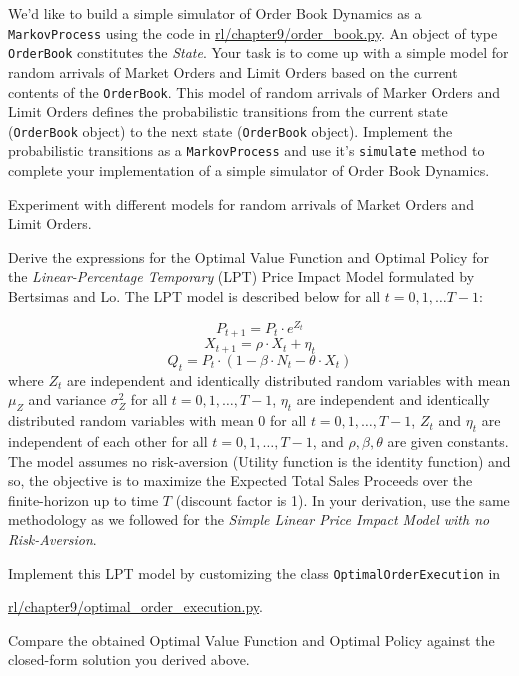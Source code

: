 \documentclass[12pt]{exam}
\begin{document}
\begin{questions}
\question We'd like to build a simple simulator of Order Book Dynamics as a \lstinline{MarkovProcess} using the code in \href{https://github.com/TikhonJelvis/RL-book/blob/master/rl/chapter9/order_book.py}{rl\//chapter9\//order\_book.py}. An object of type \lstinline{OrderBook} constitutes the {\em State}. Your task is to come up with a simple model for random arrivals of Market Orders and Limit Orders based on the current contents of the \lstinline{OrderBook}. This model of random arrivals of Marker Orders and Limit Orders defines the probabilistic transitions from the current state (\lstinline{OrderBook} object) to the next state (\lstinline{OrderBook} object). Implement the probabilistic transitions as a \lstinline{MarkovProcess} and use it's \lstinline{simulate} method to complete your implementation of a simple simulator of Order Book Dynamics.

Experiment with different models for random arrivals of Market Orders and Limit Orders.

\question Derive the expressions for the Optimal Value Function and Optimal Policy for the {\em Linear-Percentage Temporary} (LPT) Price Impact Model formulated by Bertsimas and Lo. The LPT model is described below for all $t = 0, 1, \ldots T-1$:

$$P_{t+1} = P_t \cdot e^{Z_t}$$
$$X_{t+1} = \rho \cdot X_t + \eta_t$$
$$Q_t = P_t \cdot (1 - \beta \cdot N_t - \theta \cdot X_t)$$
where $Z_t$ are independent and identically distributed random variables with mean $\mu_Z$ and variance $\sigma^2_Z$ for all $t = 0, 1, \ldots, T-1$, $\eta_t$ are independent and identically distributed random variables with mean 0 for all $t = 0, 1, \ldots, T-1$, $Z_t$ and $\eta_t$ are independent of each other for all $t = 0, 1, \ldots, T-1$, and $\rho, \beta, \theta$ are given constants. The model assumes no risk-aversion (Utility function is the identity function) and so, the objective is to maximize the Expected Total Sales Proceeds over the finite-horizon up to time $T$ (discount factor is 1). In your derivation, use the same methodology as we followed for the {\em Simple Linear Price Impact Model with no Risk-Aversion}.

Implement this LPT model by customizing the class \lstinline{OptimalOrderExecution} in 

\href{https://github.com/TikhonJelvis/RL-book/blob/master/rl/chapter9/optimal_order_execution.py}{rl\//chapter9\//optimal\_order\_execution.py}.  

Compare the obtained Optimal Value Function and Optimal Policy against the closed-form solution you derived above.

\end{questions}
\end{document}
